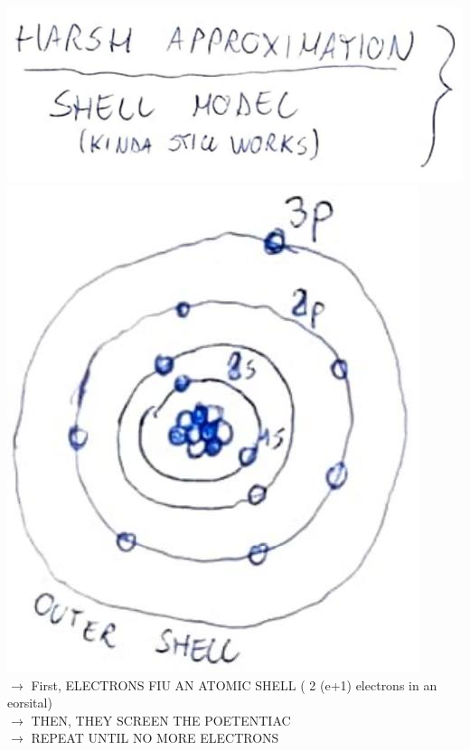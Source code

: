 \documentclass[10pt]{article}
\begin{document}
\includegraphics[max width=\textwidth, center]{2025_10_16_22329e0f50bdd2511b17g-12(2)}\\
\includegraphics[max width=\textwidth, center]{2025_10_16_22329e0f50bdd2511b17g-12(1)}\\
$\rightarrow$ First, ELECTRONS FIU AN ATOMIC SHELL ( 2 (e+1) electrons in an eorsital)\\
$\rightarrow$ THEN, THEY SCREEN THE POETENTIAC\\
$\rightarrow$ REPEAT UNTIL NO MORE ELECTRONS
\end{document}
